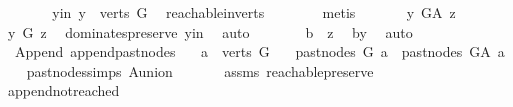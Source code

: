 \begin{isabellebody}
\ \ \ \ \isamarkupfalse%
\ \isamarkupfalse%
\ y{\isacharunderscore}{\kern0pt}in{\isacharcolon}{\kern0pt}\ {\isachardoublequoteopen}y\ {\isasymin}\ verts\ G{\isachardoublequoteclose}\ \isamarkupfalse%
\ reachable{}{\isacharunderscore}{\kern0pt}in{\isacharunderscore}{\kern0pt}verts{\isacharparenleft}{\kern0pt}{}{\isacharparenright}{\kern0pt}\isanewline
\ \ \ \ \ \ \isamarkupfalse%
\ {\isacharparenleft}{\kern0pt}metis{\isacharparenright}{\kern0pt}\ \isanewline
\ \ \ \ \isamarkupfalse%
\ {\isachardoublequoteopen}y\ {\isasymrightarrow}\isactrlbsub G{\isacharunderscore}{\kern0pt}A\isactrlesub \ z{\isachardoublequoteclose}\isanewline
\ \ \ \ \isamarkupfalse%
\ \isamarkupfalse%
\ {\isachardoublequoteopen}y\ {\isasymrightarrow}\isactrlbsub G\isactrlesub \ z{\isachardoublequoteclose}\ \isamarkupfalse%
\ dominates{\isacharunderscore}{\kern0pt}preserve\ y{\isacharunderscore}{\kern0pt}in\ \isamarkupfalse%
\ auto\isanewline
\ \ \ \ \isamarkupfalse%
\ \isamarkupfalse%
\ {\isachardoublequoteopen}b\ {\isasymrightarrow}\isactrlsup {\isacharplus}{\kern0pt}\ z{\isachardoublequoteclose}\ \isamarkupfalse%
\ b{\isacharunderscore}{\kern0pt}y\ \isamarkupfalse%
\ auto\isanewline
\ \ \isamarkupfalse%
\isanewline
{}\isamarkupfalse%
%
\endisatagproof
{\isafoldproof}%
%
\isadelimproof
\isanewline
%
\endisadelimproof
\isanewline
{}\isamarkupfalse%
\ {\isacharparenleft}{\kern0pt}\ Append{\isacharparenright}{\kern0pt}\ append{\isacharunderscore}{\kern0pt}past{\isacharunderscore}{\kern0pt}nodes{\isacharcolon}{\kern0pt}\isanewline
\ \ \ {\isachardoublequoteopen}a\ {\isasymin}\ verts\ G{\isachardoublequoteclose}\isanewline
\ \ \ {\isachardoublequoteopen}past{\isacharunderscore}{\kern0pt}nodes\ G\ a\ {\isacharequal}{\kern0pt}\ past{\isacharunderscore}{\kern0pt}nodes\ G{\isacharunderscore}{\kern0pt}A\ a{\isachardoublequoteclose}\isanewline
%
\isadelimproof
\ \ %
\endisadelimproof
%
\isatagproof
{}\isamarkupfalse%
\ past{\isacharunderscore}{\kern0pt}nodes{\isachardot}{\kern0pt}simps\ A{\isacharunderscore}{\kern0pt}union\ \isamarkupfalse%
\ \isanewline
\ \ \ \ assms\ reachable{}{\isacharunderscore}{\kern0pt}preserve\isanewline
\ \ \isamarkupfalse%
\ append{\isacharunderscore}{\kern0pt}not{\isacharunderscore}{\kern0pt}reached\ \isamarkupfalse%

\end{isabellebody}
